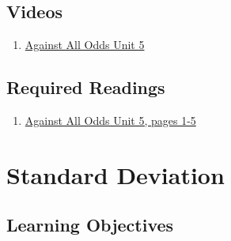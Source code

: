\documentclass[letterpaper,9pt,twocolumn,twoside,printwatermark=false]{pinp}
\providecommand{\tightlist}{%
  \setlength{\itemsep}{0pt}\setlength{\parskip}{0pt}}
\begin{document}
\subsection{Videos}\label{videos}

\begin{enumerate}
\def\labelenumi{\arabic{enumi}.}
\tightlist
\item
  \href{https://www.learner.org/courses/againstallodds/unitpages/unit05.html}{Against
  All Odds Unit 5}
\end{enumerate}

\subsection{Required Readings}\label{required-readings}

\begin{enumerate}
\def\labelenumi{\arabic{enumi}.}
\tightlist
\item
  \href{https://www.learner.org/courses/againstallodds/pdfs/AgainstAllOdds_StudentGuide_Unit03.pdf\#page=1}{Against
  All Odds Unit 5, pages 1-5}
\end{enumerate}

\vspace*{0.25cm}

\section{Standard Deviation}\label{standard-deviation}

\subsection{Learning Objectives}\label{learning-objectives-1}
\end{document}
